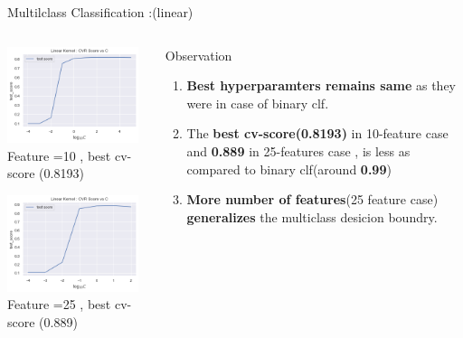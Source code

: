 \documentclass[12pt,t]{beamer}
\begin{document}
\begin{frame}[t]{Multilclass Classification :(linear)}

    \scriptsize

    \begin{columns}
        \begin{column}[T]{0.5\linewidth}
            \includegraphics[width=\linewidth,height=80pt]{images/p1a/3(multiclass)/multilibsvm_linear10f.png}
            \vspace{-2pt}
            \centering Feature =10 , best cv-score (0.8193)

            \includegraphics[width=\linewidth,height=80pt]{images/p1a/3(multiclass)/multilibsvm_linear25f.png}
            \vspace{-2pt}
            \centering Feature =25 , best cv-score (0.889)


        \end{column}
        \begin{column}[T]{0.5\linewidth}
            \begin{block}{Observation}
                \begin{enumerate}
                    \item \textbf{Best hyperparamters remains same} as they were in case of binary clf.
                    \item The \textbf{best cv-score(0.8193)} in 10-feature case and \textbf{0.889} in 25-features case , is less as compared to binary clf(around \textbf{0.99})
                    \item \textbf{More number of features}(25 feature case) \textbf{generalizes} the multiclass desicion boundry.
                \end{enumerate}
            \end{block}
        \end{column}        
    \end{columns}


\end{frame}
\end{document}
